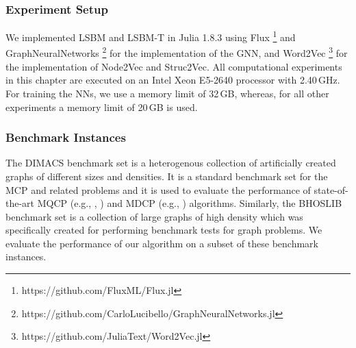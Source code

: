 \documentclass[draft,final]{vutinfth} %
\begin{document}
\subsubsection{Experiment Setup}
We implemented LSBM and LSBM-T in Julia 1.8.3 using Flux \footnote{https://github.com/FluxML/Flux.jl} and GraphNeuralNetworks \footnote{https://github.com/CarloLucibello/GraphNeuralNetworks.jl}\cite{Lucibello2021GNN} for the implementation of the GNN, and Word2Vec \footnote{https://github.com/JuliaText/Word2Vec.jl} for the implementation of Node2Vec and Struc2Vec. All computational experiments in this chapter are executed on an Intel Xeon E5-2640 processor with 2.40\,GHz. For training the NNs, we use a memory limit of 32\,GB, whereas, for all other experiments a memory limit of 20\,GB is used. 

\subsubsection{Benchmark Instances}
The DIMACS benchmark set is a heterogenous collection of artificially created graphs of different sizes and densities. It is a standard benchmark set for the MCP and related problems and it is used to evaluate the performance of state-of-the-art MQCP (e.g., \cite{peng_solving_2021}, \cite{chen_nuqclq_2021}) and MDCP (e.g., \cite{chen2021computing}) algorithms. Similarly, the BHOSLIB benchmark set is a collection of large graphs of high density which was specifically created for performing benchmark tests for graph problems. 
We evaluate the performance of our algorithm on a subset of these benchmark instances. 

\end{document}
